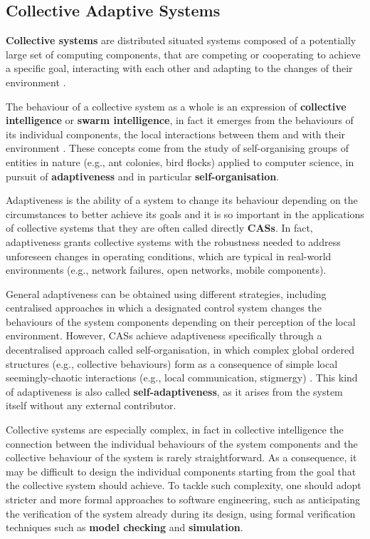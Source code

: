 
\subsection{Collective Adaptive Systems}
\label{section:background:concepts:cas}

\textbf{Collective systems} are distributed situated systems composed of a
potentially large set of computing components, that are competing or cooperating
to achieve a specific goal, interacting with each other and adapting to the
changes of their environment \cite{CAS}.

The behaviour of a collective system as a whole is an expression of
\textbf{collective intelligence} or \textbf{swarm intelligence}, in fact it
emerges from the behaviours of its individual components, the local
interactions between them and with their environment \cite{SwarmIntelligence}.
These concepts come from the study of self-organising groups of entities in
nature (e.g., ant colonies, bird flocks) applied to computer science, in
pursuit of \textbf{adaptiveness} and in particular \textbf{self-organisation}.

Adaptiveness is the ability of a system to change its behaviour depending on
the circumstances to better achieve its goals and it is so important in the
applications of collective systems that they are often called directly
\textbf{\acp{CAS}}. In fact, adaptiveness grants collective systems with the
robustness needed to address unforeseen changes in operating conditions, which
are typical in real-world environments (e.g., network failures, open networks,
mobile components).

General adaptiveness can be obtained using different strategies, including
centralised approaches in which a designated control system changes the
behaviours of the system components depending on their perception of the local
environment. However, \acp{CAS} achieve adaptiveness specifically through a
decentralised approach called self-organisation, in which complex global
ordered structures (e.g., collective behaviours) form as a consequence of
simple local seemingly-chaotic interactions (e.g., local communication,
stigmergy) \cite{SelfOrganization}. This kind of adaptiveness is also called
\textbf{self-adaptiveness}, as it arises from the system itself without any
external contributor.

Collective systems are especially complex, in fact in collective intelligence
the connection between the individual behaviours of the system components and
the collective behaviour of the system is rarely straightforward. As a
consequence, it may be difficult to design the individual components starting
from the goal that the collective system should achieve. To tackle such
complexity, one should adopt stricter and more formal approaches to software
engineering, such as anticipating the verification of the system already during
its design, using formal verification techniques such as \textbf{model
checking} and \textbf{simulation}.

